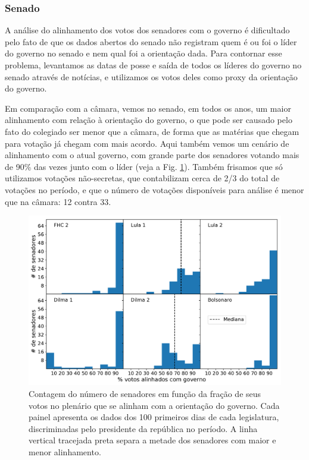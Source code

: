 \documentclass[12pt,a4paper]{article}
\begin{document}
\subsubsection{Senado}

A análise do alinhamento dos votos dos senadores com o governo é dificultado pelo fato de que os dados abertos do senado não registram quem é ou foi o líder do governo no senado e nem qual foi a orientação dada. Para contornar esse problema, levantamos as datas de posse e saída de todos os líderes do governo no senado através de notícias, e utilizamos os votos deles como proxy da orientação do governo.

Em comparação com a câmara, vemos no senado, em todos os anos, um maior alinhamento com relação à orientação do governo, o que pode ser causado pelo fato do colegiado ser menor que a câmara, de forma que as matérias que chegam para votação já chegam com mais acordo.
Aqui também vemos um cenário de alinhamento com o atual governo, com grande parte dos senadores votando mais de 90\% das vezes junto com o líder (veja a Fig. \ref{fig:apoio-governo-senadores}). Também frisamos que só utilizamos votações não-secretas, que contabilizam cerca de 2/3 do total 
de votações no período, e que o número de votações disponíveis para análise é menor que na câmara: 12 contra 33. 

\begin{figure}[H]
\centering
\includegraphics[width=1.0\textwidth]{graficos/senado/apoio_ao_governo_senadores_2019-05-09.pdf}
\caption{Contagem do número de senadores em função da fração de seus votos no plenário que se
  alinham com a orientação do governo. Cada painel apresenta os dados dos 100 primeiros dias de
  cada legislatura, discriminadas pelo presidente da república no período. A linha vertical tracejada preta
  separa a metade dos senadores com maior e menor alinhamento.}
\label{fig:apoio-governo-senadores}
\end{figure}
\end{document}
